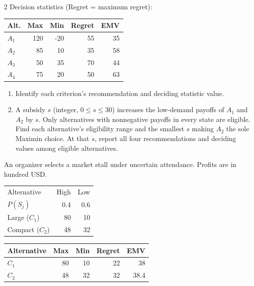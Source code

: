 \begin{multicols}{2}
		Decision statistics (Regret = maximum regret):
		
		\vspace{-3mm}
		\begin{center}\small\setlength{\tabcolsep}{4pt}
			\begin{tabular}{lrrrr}\toprule
				Alt. & Max & Min & Regret & EMV\\ \midrule
				$A_1$ & 120 & -20 & 55 & 35\\
				$A_2$ & 85 & 10 & 35 & 58\\
				$A_3$ & 50 & 35 & 70 & 44\\
				$A_4$ & 75 & 20 & 50 & 63\\
				\bottomrule
			\end{tabular}
		\end{center}
		\vspace{-3mm}
		
		\begin{enumerate}[label=\textbf{(\alph*)},leftmargin=*]
			\item Identify each criterion's recommendation and deciding statistic value. 
			
			\item A subsidy $s$ (integer, $0\leq s\leq30$) increases the low-demand payoffs of $A_1$ and $A_2$ by $s$. Only alternatives with nonnegative payoffs in every state are eligible. Find each alternative's eligibility range and the smallest $s$ making $A_2$ the sole Maximin choice. At that $s$, report all four recommendations and deciding values among eligible alternatives. 
		\end{enumerate}
		
		An organizer selects a market stall under uncertain attendance. Profits are in hundred USD.
		
		\begin{center}\small\setlength{\tabcolsep}{4pt}
			\begin{tabular}{lrr}\toprule
				Alternative & High & Low\\
				$P(S_j)$ & 0.4 & 0.6\\ \midrule
				Large ($C_1$) & 80 & 10\\
				Compact ($C_2$) & 48 & 32\\
				\bottomrule
			\end{tabular}
		\end{center}
		
		\begin{center}\small\setlength{\tabcolsep}{4pt}
			\begin{tabular}{lrrrr}\toprule
				Alternative & Max & Min & Regret & EMV\\ \midrule
				$C_1$ & 80 & 10 & 22 & 38\\
				$C_2$ & 48 & 32 & 32 & 38.4\\
				\bottomrule
			\end{tabular}
		\end{center}
		

\end{multicols}
